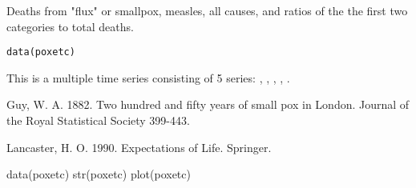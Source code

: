 \begin{Description}\relax
Deaths from "flux" or smallpox, measles, all causes, and ratios
of the the first two categories to total deaths.
\end{Description}
\begin{Usage}
\begin{verbatim}data(poxetc)\end{verbatim}
\end{Usage}
\begin{Format}\relax
This is a multiple time series consisting of 5 series:
, , , , .
\end{Format}
\begin{Details}\relax
\end{Details}
\begin{Source}\relax
Guy, W. A. 1882. Two hundred and fifty years of small pox in London.
Journal of the Royal Statistical Society 399-443.
\end{Source}
\begin{References}\relax
Lancaster, H. O. 1990. Expectations of Life. Springer.
\end{References}
\begin{Examples}
\begin{ExampleCode}
data(poxetc)
str(poxetc)
plot(poxetc) 
\end{ExampleCode}
\end{Examples}

